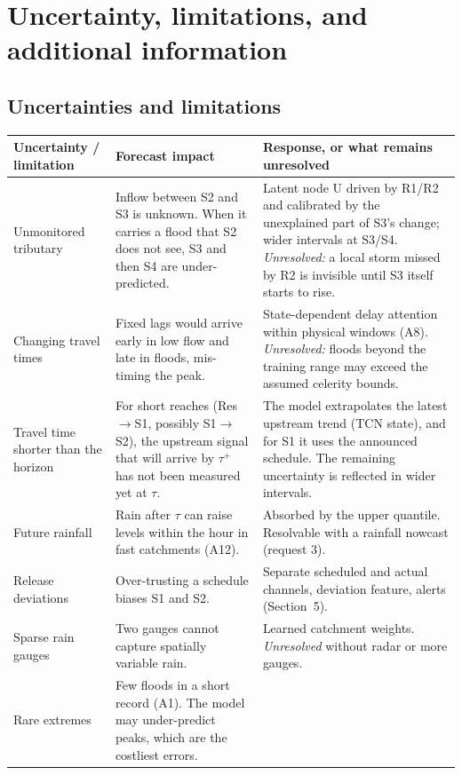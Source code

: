 \section{Uncertainty, limitations, and additional information}
\subsection*{Uncertainties and limitations}
\begin{table}[H]
\centering\small
\begin{tabularx}{\textwidth}{@{}p{2.9cm}XX@{}}
\toprule
Uncertainty / limitation & Forecast impact & Response, or what remains unresolved\\
\midrule
Unmonitored tributary &
Inflow between S2 and S3 is unknown. When it carries a flood that S2 does not see, S3 and then S4
are under-predicted. &
Latent node U driven by R1/R2 and calibrated by the unexplained part of S3's change; wider
intervals at S3/S4. \emph{Unresolved:} a local storm missed by R2 is invisible until S3 itself
starts to rise.\\
Changing travel times &
Fixed lags would arrive early in low flow and late in floods, mis-timing the peak. &
State-dependent delay attention within physical windows (A8). \emph{Unresolved:} floods beyond the
training range may exceed the assumed celerity bounds.\\
Travel time shorter than the horizon &
For short reaches (Res$\to$S1, possibly S1$\to$S2), the upstream signal that will arrive by
$\tau^{+}$ has not been measured yet at $\tau$. &
The model extrapolates the latest upstream trend (TCN state), and for S1 it uses the announced
schedule. The remaining uncertainty is reflected in wider intervals.\\
Future rainfall &
Rain after $\tau$ can raise levels within the hour in fast catchments (A12). &
Absorbed by the upper quantile. Resolvable with a rainfall nowcast (request 3).\\
Release deviations &
Over-trusting a schedule biases S1 and S2. &
Separate scheduled and actual channels, deviation feature, alerts (Section~5).\\
Sparse rain gauges &
Two gauges cannot capture spatially variable rain. &
Learned catchment weights. \emph{Unresolved} without radar or more gauges.\\
Rare extremes &
Few floods in a short record (A1). The model may under-predict peaks, which are the costliest errors. &

\end{tabularx}
\end{table}

